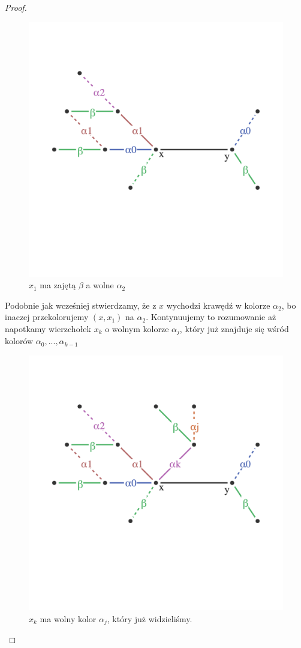 \begin{proof}
	\begin{figure}[ht]
		\centering
		\includegraphics[scale=0.6]{images/vizing/step_two.png}
		\caption{$x_1$ ma zajętą $\beta$ a wolne $\alpha_2$}
	\end{figure}

	Podobnie jak wcześniej stwierdzamy, że z $x$ wychodzi krawędź w kolorze $\alpha_2$, bo inaczej przekolorujemy $(x, x_1)$ na $\alpha_2$. Kontynuujemy to rozumowanie aż napotkamy wierzchołek $x_k$ o wolnym kolorze $\alpha_j$, który już znajduje się wśród kolorów $\alpha_0, ..., \alpha_{k-1}$


	\begin{figure}[ht]
		\centering
		\includegraphics[scale=0.6]{images/vizing/step_three.png}
		\caption{$x_k$ ma wolny kolor $\alpha_j$, który już widzieliśmy.}
	\end{figure}


\end{proof}
